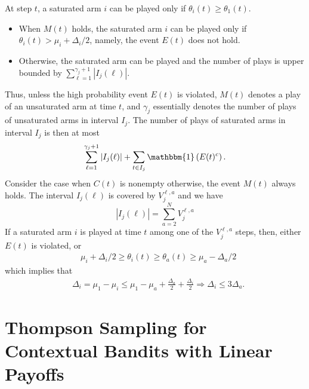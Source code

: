 \documentclass[letterpaper,11pt]{article}
\begin{document}
At step $t$, a saturated arm $i$ can be played only if $\theta_i(t) \geq \theta_1(t)$. 
\begin{itemize}
    \item When $M(t)$ holds, the saturated arm $i$ can be played only if $\theta_i(t) > \mu_i + \Delta_i / 2$, namely, the event $E(t)$ does not hold.
    \item Otherwise, the saturated arm can be played and the number of plays is upper bounded by $\sum_{\ell=1}^{\gamma_j+1} |I_j(\ell)|$. 
\end{itemize}
 Thus, unless the high probability event $E(t)$ is violated, $M(t)$ denotes a play of an unsaturated arm at time $t$, and $\gamma_j$ essentially denotes the number of plays of unsaturated arms in interval $I_j$. The number of plays of saturated arms in interval $I_j$ is then at most 
\begin{equation*}
    \sum_{\ell=1}^{\gamma_j+1} \left|I_j(\ell)\right| + \sum_{t \in I_j} \mathbbm{1}\left(E(t)^c\right). 
\end{equation*}
Consider the case when $C(t)$ is nonempty otherwise, the event $M(t)$ always holds. The interval $I_j(\ell)$ is covered by $V_{j}^{\ell, a}$ and we have
\begin{equation*}
    |I_j(\ell)| = \sum_{a=2}^N V_j^{\ell, a}
\end{equation*}
If a saturated arm $i$ is played at time $t$ among one of the $V_j^{\ell,a}$ steps, then, either $E(t)$ is violated, or 
$$
\begin{aligned}
&\mu_i+\Delta_i / 2 \geq \theta_i(t) \geq \theta_a(t) \geq \mu_a-\Delta_a / 2
\end{aligned}
$$
which implies that
$$
\begin{aligned}
&\Delta_i=\mu_1-\mu_i \leq \mu_1-\mu_a+\frac{\Delta_a}{2}+\frac{\Delta_i}{2} \Rightarrow \Delta_i \leq 3 \Delta_a .
\end{aligned}
$$












\section{Thompson Sampling for Contextual Bandits with Linear Payoffs}
\end{document}
